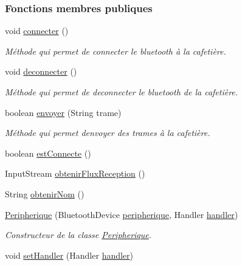 \subsubsection*{Fonctions membres publiques}
\begin{DoxyCompactItemize}
\item 
void \hyperlink{classcom_1_1example_1_1ekawa_1_1_peripherique_aeec8c1b360496726a5aecd6c129de81b}{connecter} ()
\begin{DoxyCompactList}\small\item\em Méthode qui permet de connecter le bluetooth à la cafetière. \end{DoxyCompactList}\item 
void \hyperlink{classcom_1_1example_1_1ekawa_1_1_peripherique_aadfd24f4d783a7834c044041c7c035bb}{deconnecter} ()
\begin{DoxyCompactList}\small\item\em Méthode qui permet de deconnecter le bluetooth de la cafetière. \end{DoxyCompactList}\item 
boolean \hyperlink{classcom_1_1example_1_1ekawa_1_1_peripherique_ac1361bc1a445b00c4c7ebb56dfee274d}{envoyer} (String trame)
\begin{DoxyCompactList}\small\item\em Méthode qui permet d\textquotesingle{}envoyer des trames à la cafetière. \end{DoxyCompactList}\item 
boolean \hyperlink{classcom_1_1example_1_1ekawa_1_1_peripherique_a963c20e3fba4ed926e9dee972e3b6b39}{est\+Connecte} ()
\item 
Input\+Stream \hyperlink{classcom_1_1example_1_1ekawa_1_1_peripherique_a8b88d0a0d9e0c1b1aae04ba7c9d24619}{obtenir\+Flux\+Reception} ()
\item 
String \hyperlink{classcom_1_1example_1_1ekawa_1_1_peripherique_ad54cfafe03dfcf18cbd9b20602c4d86e}{obtenir\+Nom} ()
\item 
\hyperlink{classcom_1_1example_1_1ekawa_1_1_peripherique_af952f48e767069b44804a96119bf3c75}{Peripherique} (Bluetooth\+Device \hyperlink{classcom_1_1example_1_1ekawa_1_1_peripherique_ab509bd2180c53845197423813a97f025}{peripherique}, Handler \hyperlink{classcom_1_1example_1_1ekawa_1_1_peripherique_ab6a0c0cae2eb087315d0d04d1cf6c3dc}{handler})
\begin{DoxyCompactList}\small\item\em Constructeur de la classe \hyperlink{classcom_1_1example_1_1ekawa_1_1_peripherique}{Peripherique}. \end{DoxyCompactList}\item 
void \hyperlink{classcom_1_1example_1_1ekawa_1_1_peripherique_a2cfa1b391efb3f2e7a78e761e965e7e3}{set\+Handler} (Handler \hyperlink{classcom_1_1example_1_1ekawa_1_1_peripherique_ab6a0c0cae2eb087315d0d04d1cf6c3dc}{handler})
\end{DoxyCompactItemize}
